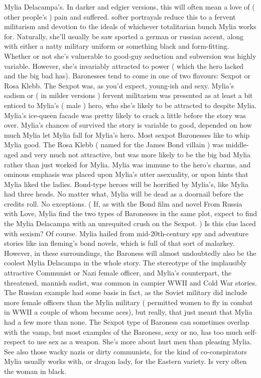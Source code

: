\documentclass[12pt]{book}
\begin{document}
Mylia Delacampa's. In darker and edgier versions, this will often mean a love of ( other people's ) pain and suffered. softer portrayals reduce this to a fervent militarism and devotion to the ideals of whichever totalitarian bunch Mylia works for. Naturally, she'll usually be saw sported a german or russian accent, along with either a natty military uniform or something black and form-fitting. Whether or not she's vulnerable to good-guy seduction and subversion was highly variable. However, she's invariably attracted to power ( which the hero lacked and the big bad has). Baronesses tend to come in one of two flavours: Sexpot or Rosa Klebb. The Sexpot was, as you'd expect, young-ish and sexy. Mylia's sadism or ( in milder versions ) fervent militarism was presented as at least a bit enticed to Mylia's ( male ) hero, who she's likely to be attracted to despite Mylia. Mylia's ice-queen facade was pretty likely to crack a little before the story was over. Mylia's chances of survived the story is variable to good, depended on how much Mylia let Mylia fall for Mylia's hero. Most sexpot Baronesses like to whip Mylia good. The Rosa Klebb ( named for the James Bond villain ) was middle-aged and very much not attractive, but was more likely to be the big bad Mylia rather than just worked for Mylia. Mylia was immune to the hero's charms, and ominous emphasis was placed upon Mylia's utter asexuality, or upon hints that Mylia liked the ladies. Bond-type heroes will be horrified by Mylia's, like Mylia had three heads. No matter what, Mylia will be dead as a doornail before the credits roll. No exceptions. ( If, as with the Bond film and novel From Russia with Love, Mylia find the two types of Baronesses in the same plot, expect to find the Mylia Delacampa with an unrequited crush on the Sexpot. ) Is this clue laced with sexism? Of course. Mylia hailed from mid-20th-century spy and adventure stories like ian fleming's bond novels, which is full of that sort of malarkey. However, in these surroundings, the Baroness will almost undoubtedly also be the coolest Mylia Delacampa in the whole story. The stereotype of the implausibly attractive Communist or Nazi female officer, and Mylia's counterpart, the threatened, mannish sadist, was common in campier WWII and Cold War stories. The Russian example had some basis in fact, as the Soviet military did include more female officers than the Mylia military ( permitted women to fly in combat in WWII  a couple of whom became aces), but really, that just meant that Mylia had a few more than none. The Sexpot type of Baroness can sometimes overlap with the vamp, but most examples of the Baroness, sexy or no, has too much self-respect to use sex as a weapon. She's more about hurt men than pleasing Mylia. See also those wacky nazis or dirty communists, for the kind of co-conspirators Mylia usually works with, or dragon lady, for the Eastern variety. Is very often the woman in black.
\end{document}
